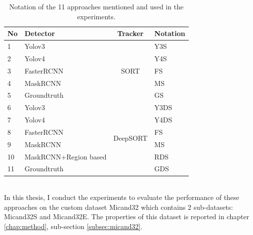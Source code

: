 \begin{table}[]
	\centering
	\label{tab:notation}
	\caption{Notation of the 11 approaches mentioned and used in the experiments.}
	\begin{tabular}{|l|l|c|l|}
		\hline
		No & Detector              & Tracker                                        & Notation \\ \hline
		1  & Yolov3                & \multirow{5}{*}{SORT}                          & Y3S      \\ \cline{1-2} \cline{4-4} 
		2  & Yolov4                &                                                & Y4S      \\ \cline{1-2} \cline{4-4} 
		3  & FasterRCNN            &                                                & FS       \\ \cline{1-2} \cline{4-4} 
		4  & MaskRCNN              &                                                & MS       \\ \cline{1-2} \cline{4-4} 
		5  & Groundtruth           &                                                & GS       \\ \hline
		6  & Yolov3                & \multicolumn{1}{c|}{\multirow{6}{*}{DeepSORT}} & Y3DS     \\ \cline{1-2} \cline{4-4} 
		7  & Yolov4                & \multicolumn{1}{c|}{}                          & Y4DS     \\ \cline{1-2} \cline{4-4} 
		8  & FasterRCNN            & \multicolumn{1}{c|}{}                          & FS       \\ \cline{1-2} \cline{4-4} 
		9  & MaskRCNN              & \multicolumn{1}{c|}{}                          & MS       \\ \cline{1-2} \cline{4-4} 
		10 & MaskRCNN+Region based & \multicolumn{1}{c|}{}                          & RDS      \\ \cline{1-2} \cline{4-4} 
		11 & Groundtruth           & \multicolumn{1}{c|}{}                          & GDS      \\ \hline
	\end{tabular}
	\vspace{-0.7cm}
\end{table}
\\In this thesis, I conduct the experiments to evaluate the performance of these approaches on the custom dataset Micand32 which contains 2 sub-datasets: Micand32S and Micand32E. The properties of this dataset is reported in chapter \ref{chap:method}, sub-section \ref{subsec:micand32}.
